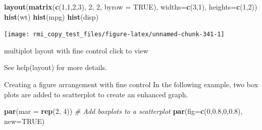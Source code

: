 \documentclass[]{book}
\newenvironment{Shaded}{\begin{snugshade}}{\end{snugshade}}
\newcommand{\CommentTok}[1]{\textcolor[rgb]{0.56,0.35,0.01}{\textit{#1}}}
\newcommand{\DataTypeTok}[1]{\textcolor[rgb]{0.13,0.29,0.53}{#1}}
\newcommand{\DecValTok}[1]{\textcolor[rgb]{0.00,0.00,0.81}{#1}}
\newcommand{\FloatTok}[1]{\textcolor[rgb]{0.00,0.00,0.81}{#1}}
\newcommand{\KeywordTok}[1]{\textcolor[rgb]{0.13,0.29,0.53}{\textbf{#1}}}
\newcommand{\NormalTok}[1]{#1}
\newcommand{\OtherTok}[1]{\textcolor[rgb]{0.56,0.35,0.01}{#1}}
\theoremstyle{definition}
\theoremstyle{definition}
\theoremstyle{definition}
\theoremstyle{remark}
\begin{document}
\begin{Shaded}
\begin{Highlighting}[]
\KeywordTok{layout}\NormalTok{(}\KeywordTok{matrix}\NormalTok{(}\KeywordTok{c}\NormalTok{(}\DecValTok{1}\NormalTok{,}\DecValTok{1}\NormalTok{,}\DecValTok{2}\NormalTok{,}\DecValTok{3}\NormalTok{), }\DecValTok{2}\NormalTok{, }\DecValTok{2}\NormalTok{, }\DataTypeTok{byrow =} \OtherTok{TRUE}\NormalTok{), }
    \DataTypeTok{widths=}\KeywordTok{c}\NormalTok{(}\DecValTok{3}\NormalTok{,}\DecValTok{1}\NormalTok{), }\DataTypeTok{heights=}\KeywordTok{c}\NormalTok{(}\DecValTok{1}\NormalTok{,}\DecValTok{2}\NormalTok{))}
\KeywordTok{hist}\NormalTok{(wt)}
\KeywordTok{hist}\NormalTok{(mpg)}
\KeywordTok{hist}\NormalTok{(disp)}
\end{Highlighting}
\end{Shaded}

\begin{center}\texttt{[image: rmi\_copy\_test\_files/figure-latex/unnamed-chunk-341-1]} \end{center}

multiplot layout with fine control click to view

See help(layout) for more details.

Creating a figure arrangement with fine control In the following
example, two box plots are added to scatterplot to create an enhanced
graph.

\begin{Shaded}
\begin{Highlighting}[]
\KeywordTok{par}\NormalTok{(}\DataTypeTok{mar =} \KeywordTok{rep}\NormalTok{(}\DecValTok{2}\NormalTok{, }\DecValTok{4}\NormalTok{)) }
\CommentTok{# Add boxplots to a scatterplot}
\KeywordTok{par}\NormalTok{(}\DataTypeTok{fig=}\KeywordTok{c}\NormalTok{(}\DecValTok{0}\NormalTok{,}\FloatTok{0.8}\NormalTok{,}\DecValTok{0}\NormalTok{,}\FloatTok{0.8}\NormalTok{), }\DataTypeTok{new=}\OtherTok{TRUE}\NormalTok{)}
\end{Highlighting}
\end{Shaded}
\end{document}
